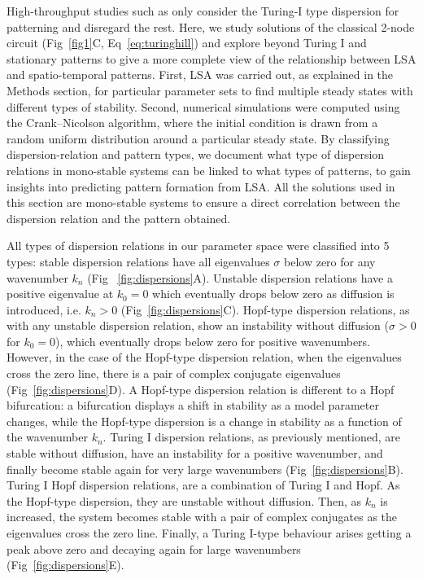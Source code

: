 \documentclass[10pt,letterpaper]{article}
\begin{document}
High-throughput studies such as \cite{Scholes2019, Zheng2016, Marcon} only consider the Turing-I type dispersion for patterning and disregard the rest.
Here, we study solutions of the classical 2-node circuit (Fig~\ref{fig1}C, Eq~\ref{eq:turinghill}) and explore beyond Turing I and stationary patterns to give a more complete view of the relationship between LSA and spatio-temporal patterns. 
First, LSA was carried out, as explained in the Methods section, for particular parameter sets to find multiple steady states with different types of stability. 
Second, numerical simulations were computed using the Crank–Nicolson algorithm, where the initial condition is drawn from a random uniform distribution around a particular steady state. By classifying dispersion-relation and pattern types, we document what type of dispersion relations in mono-stable systems can be linked to what types of patterns, to gain insights into predicting pattern formation from LSA. All the solutions used in this section are mono-stable systems to ensure a direct correlation between the dispersion relation and the pattern obtained.

All types of dispersion relations in our parameter space were classified into 5 types: stable dispersion relations have all eigenvalues $\sigma$ below zero for any wavenumber $k_{n}$ (Fig ~\ref{fig:dispersions}A). Unstable dispersion relations have a positive eigenvalue at $k_{0}=0$ which eventually drops below zero as diffusion is introduced, i.e. $k_{n}>0$ (Fig~\ref{fig:dispersions}C). Hopf-type dispersion relations, as with any unstable dispersion relation, show an instability without diffusion ($\sigma>0$ for $k_{0}=0$), which eventually drops below zero for positive wavenumbers. However, in the case of the Hopf-type dispersion relation, when the eigenvalues cross the zero line, there is a pair of complex conjugate eigenvalues (Fig~\ref{fig:dispersions}D).
A Hopf-type dispersion relation is different to a Hopf bifurcation: a bifurcation displays a shift in stability as a model parameter changes, while the Hopf-type dispersion is a change in stability as a function of the wavenumber $k_{n}$.
Turing I dispersion relations, as previously mentioned, are stable without diffusion, have an instability for a positive wavenumber, and finally become stable again for very large wavenumbers (Fig~\ref{fig:dispersions}B).
Turing I Hopf dispersion relations, are a combination of Turing I and Hopf. As the Hopf-type dispersion, they are unstable without diffusion. Then, as $k_{n}$ is increased, the system becomes stable with a pair of complex conjugates as the eigenvalues cross the zero line.
Finally, a Turing I-type behaviour arises getting a peak above zero and decaying again for large wavenumbers (Fig~\ref{fig:dispersions}E).
\end{document}
